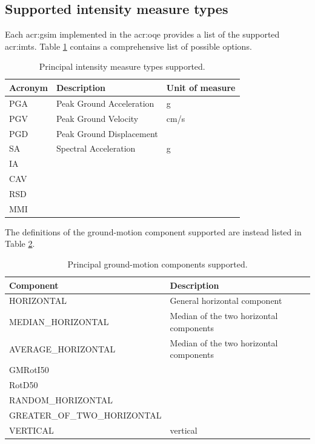 \subsection{Supported intensity measure types}
Each \gls{acr:gsim} implemented in the \gls{acr:oqe} provides a list of the 
supported \glspl{acr:imt}. Table \ref{tab:imts} contains a comprehensive list 
of possible options.
\begin{table}[!h]
\centering
\begin{tabular}{|p{3cm}p{5cm}p{3cm}|}
\hline
\rowcolor{anti-flashwhite}
\bf{Acronym} & \bf{Description} & \bf{Unit of measure} \\
\hline 
PGA & Peak Ground Acceleration & g \\
PGV & Peak Ground Velocity     & cm/s \\
PGD & Peak Ground Displacement & \\
SA  & Spectral Acceleration    & g \\
IA  &  &  \\
CAV &  &  \\
RSD &  &  \\
MMI &  &  \\
\hline
\end{tabular}
\caption{Principal intensity measure types supported.}
\label{tab:imts}
\end{table}

The definitions of the ground-motion component supported are instead listed in
Table \ref{tab:hor_comp}. 
\begin{table}[!h]
\centering
\begin{tabular}{|p{6cm}p{7cm}|}
\hline
\rowcolor{anti-flashwhite}
\bf{Component} & \bf{Description} \\
\hline 
HORIZONTAL & General horizontal component \\
MEDIAN\_HORIZONTAL & Median of the two horizontal components \\
AVERAGE\_HORIZONTAL & Median of the two horizontal components \\
GMRotI50 & \parencite{boore2010} \\
RotD50 &  \\
RANDOM\_HORIZONTAL &  \\
GREATER\_OF\_TWO\_HORIZONTAL &  \\
VERTICAL & vertical \\
\hline
\end{tabular}
\caption{Principal ground-motion components supported.}
\label{tab:hor_comp} 
\end{table}
